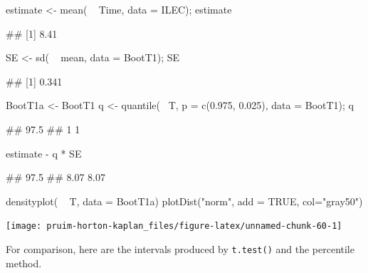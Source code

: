 \begin{Schunk}
\begin{Sinput}
estimate <- mean( ~ Time, data = ILEC); estimate
\end{Sinput}
\begin{Soutput}
## [1] 8.41
\end{Soutput}
\begin{Sinput}
SE <- sd( ~ mean, data = BootT1); SE
\end{Sinput}
\begin{Soutput}
## [1] 0.341
\end{Soutput}
\begin{Sinput}
BootT1a <- BootT1 %
q <- quantile(~ T, p = c(0.975, 0.025), data = BootT1); q
\end{Sinput}
\begin{Soutput}
## 97.5%
##     1     1
\end{Soutput}
\begin{Sinput}
estimate - q * SE
\end{Sinput}
\begin{Soutput}
## 97.5%
##  8.07  8.07
\end{Soutput}
\begin{Sinput}
densityplot( ~ T, data = BootT1a)
plotDist("norm", add = TRUE, col="gray50")
\end{Sinput}


\begin{center}\texttt{[image: pruim-horton-kaplan\_files/figure-latex/unnamed-chunk-60-1]} \end{center}

\end{Schunk}

For comparison, here are the intervals produced by \texttt{t.test()} and
the percentile method.

